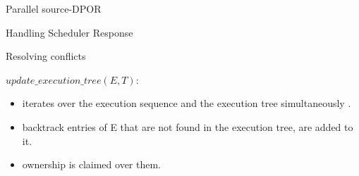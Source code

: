 \begin{frame} {Parallel source-DPOR}

\begin{algorithm}[H]
    \caption{Handling Scheduler Response}
    \label{response}
\end{algorithm}


\end{frame}
\begin{frame}{Resolving conflicts}

$update\_execution\_tree(E, T)$:

\begin{itemize}
\item iterates
over the execution sequence and the execution tree simultaneously .
\item backtrack entries of E that are not found in the execution tree, are added to it.
\item ownership is claimed over them.


\end{itemize}

\end{frame}